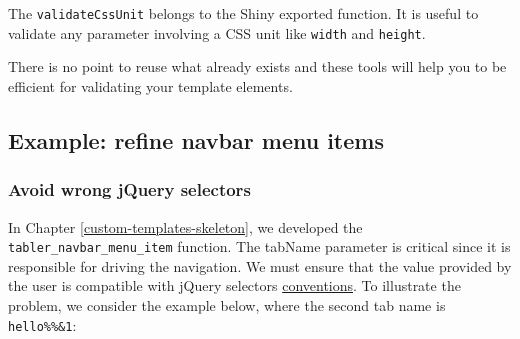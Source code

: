 \documentclass[
]{book}
\begin{document}
The \texttt{validateCssUnit} belongs to the Shiny exported function. It is useful to validate any parameter involving a CSS unit like \texttt{width} and \texttt{height}.

There is no point to reuse what already exists and these tools will help you to be efficient for validating your template elements.

\hypertarget{example-refine-navbar-menu-items}{%
\subsection{Example: refine navbar menu items}\label{example-refine-navbar-menu-items}}

\hypertarget{avoid-wrong-jquery-selectors}{%
\subsubsection{Avoid wrong jQuery selectors}\label{avoid-wrong-jquery-selectors}}

In Chapter \ref{custom-templates-skeleton}, we developed the \texttt{tabler\_navbar\_menu\_item} function. The tabName parameter is critical since it is responsible for driving the navigation. We must ensure that the value provided by the user is compatible with jQuery selectors \href{https://api.jquery.com/category/selectors/}{conventions}. To illustrate the problem, we consider the example below, where the second tab name is \texttt{hello\%\%\&1}:
\end{document}

